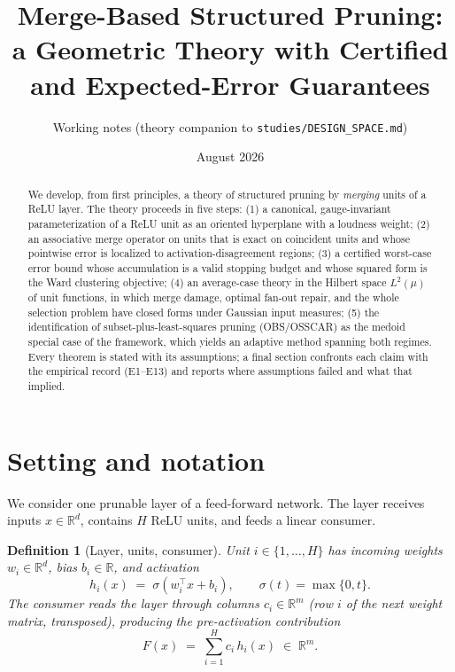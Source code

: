 \documentclass[11pt]{article}
\title{Merge-Based Structured Pruning:\\ a Geometric Theory with Certified and
Expected-Error Guarantees}
\author{Working notes (theory companion to \texttt{studies/DESIGN\_SPACE.md})}
\date{August 2026}
\newtheorem{definition}[theorem]{Definition}
\theoremstyle{remark}
\newcommand{\R}{\mathbb{R}}
\newcommand{\relu}{\sigma}
\begin{document}
\maketitle

\begin{abstract}
We develop, from first principles, a theory of structured pruning by
\emph{merging} units of a ReLU layer. The theory proceeds in five steps:
(1) a canonical, gauge-invariant parameterization of a ReLU unit as an
oriented hyperplane with a loudness weight; (2) an associative merge operator
on units that is exact on coincident units and whose pointwise error is
localized to activation-disagreement regions; (3) a certified worst-case error
bound whose accumulation is a valid stopping budget and whose squared form is
the Ward clustering objective; (4) an average-case theory in the Hilbert space
$L^2(\mu)$ of unit functions, in which merge damage, optimal fan-out repair,
and the whole selection problem have closed forms under Gaussian input
measures; (5) the identification of subset-plus-least-squares pruning
(OBS/OSSCAR) as the medoid special case of the framework, which yields an
adaptive method spanning both regimes. Every theorem is stated with its
assumptions; a final section confronts each claim with the empirical record
(E1--E13) and reports where assumptions failed and what that implied.
\end{abstract}

\tableofcontents

\section{Setting and notation}\label{sec:setting}

We consider one prunable layer of a feed-forward network. The layer receives
inputs $x \in \R^d$, contains $H$ ReLU units, and feeds a linear consumer.

\begin{definition}[Layer, units, consumer]\label{def:layer}
Unit $i \in \{1,\dots,H\}$ has incoming weights $w_i \in \R^d$, bias
$b_i \in \R$, and activation
\[
  h_i(x) \;=\; \relu(w_i^\top x + b_i), \qquad \relu(t) = \max\{0,t\}.
\]
The consumer reads the layer through columns $c_i \in \R^m$ (row $i$ of the
next weight matrix, transposed), producing the pre-activation contribution
\[
  F(x) \;=\; \sum_{i=1}^{H} c_i\, h_i(x) \;\in\; \R^m .
\]
\end{definition}
\end{document}
